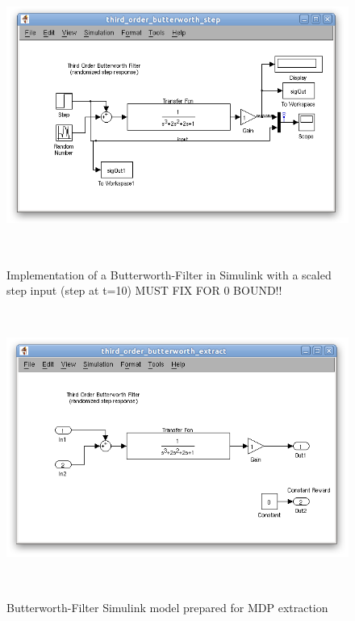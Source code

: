 \begin{figure}
\begin{center}
\includegraphics[height=9cm]{media/bw/bw_step_mdl}\\
\end{center}
\caption{Implementation of a Butterworth-Filter in Simulink with a scaled step input (step at t=10) MUST FIX FOR 0 BOUND!!}
\label{bw_step_mdl}
\end{figure}

\begin{figure}
\begin{center}
\includegraphics[height=9cm]{media/bw/bw_extract_mdl}\\
\end{center}
\caption{Butterworth-Filter Simulink model prepared for MDP extraction}
\label{bw_extract_mdl}
\end{figure}

